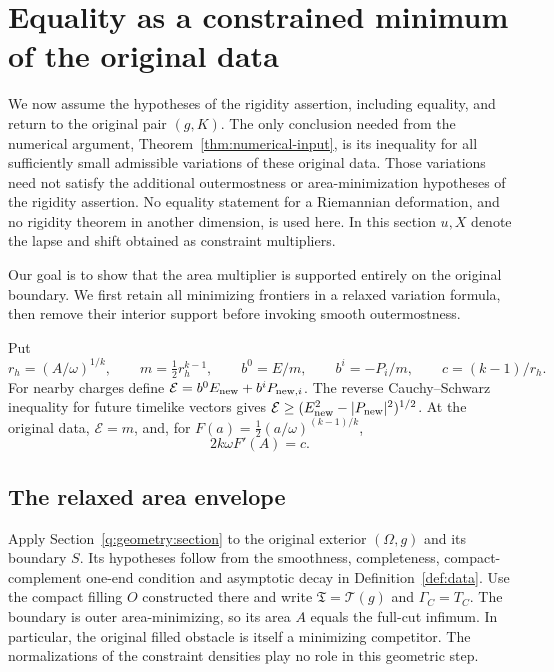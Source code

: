 \section{Equality as a constrained minimum of the original data}
\label{sec:variation}

We now assume the hypotheses of the rigidity assertion, including equality,
and return to the original pair $(g,K)$.  The only conclusion needed from
the numerical argument, Theorem~\ref{thm:numerical-input}, is its inequality for all sufficiently small
admissible variations of these original data.  Those variations need not
satisfy the additional outermostness or area-minimization hypotheses of
the rigidity assertion.  No equality statement for a Riemannian
deformation, and no rigidity theorem in another dimension, is used here.
In this section $u,X$ denote the lapse and shift obtained as constraint multipliers.

Our goal is to show that the area multiplier is supported entirely on
the original boundary. We first retain all minimizing frontiers in a
relaxed variation formula, then remove their interior support before
invoking smooth outermostness.

Put
\begin{equation}\label{eq:variation:constants}
 r_h=(A/\omega)^{1/k},\qquad m=\tfrac12r_h^{k-1},\qquad
 b^0=E/m,\qquad b^i=-P_i/m,\qquad c=(k-1)/r_h.
\end{equation}
For nearby charges define $\mathcal E=b^0E_{\rm new}+b^iP_{{\rm new},i}$.
The reverse Cauchy--Schwarz inequality for future timelike vectors gives
$\mathcal E\ge (E_{\rm new}^2-|P_{\rm new}|^2)^{1/2}$.  At the original
data, $\mathcal E=m$, and, for $F(a)=\tfrac12(a/\omega)^{(k-1)/k}$,
\begin{equation}\label{eq:variation:area-derivative-constant}
 2k\omega F'(A)=c.
\end{equation}

\subsection{The relaxed area envelope}

Apply Section~\ref{q:geometry:section} to the original exterior
$(\Omega,g)$ and its boundary $S$. Its hypotheses follow from the
smoothness, completeness, compact-complement one-end condition and
asymptotic decay in Definition~\ref{def:data}. Use the compact
filling $O$ constructed there and write
$\mathfrak T=\mathcal T(g)$ and $\Gamma_C=T_C$.
The boundary is outer area-minimizing, so its area $A$ equals the
full-cut infimum. In particular, the original filled obstacle is
itself a minimizing competitor. The normalizations of the constraint
densities play no role in this geometric step.

